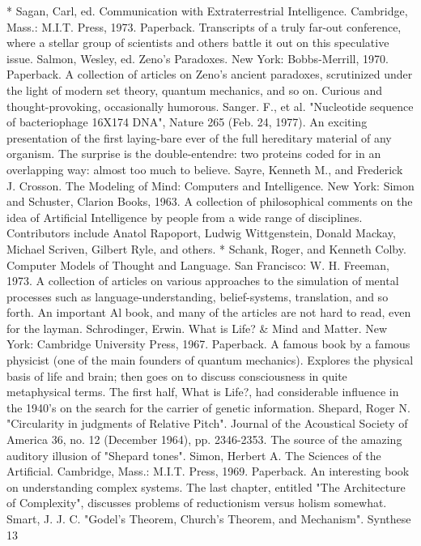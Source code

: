 * Sagan, Carl, ed. Communication with Extraterrestrial Intelligence. Cambridge, Mass.:
  M.I.T. Press, 1973. Paperback. Transcripts of a truly far-out conference, where a stellar
  group of scientists and others battle it out on this speculative issue.
Salmon, Wesley, ed. Zeno's Paradoxes. New York: Bobbs-Merrill, 1970. Paperback. A
  collection of articles on Zeno's ancient paradoxes, scrutinized under the light of modern
  set theory, quantum mechanics, and so on. Curious and thought-provoking,
  occasionally humorous.
Sanger. F., et al. "Nucleotide sequence of bacteriophage 16X174 DNA", Nature 265
  (Feb. 24, 1977). An exciting presentation of the first laying-bare ever of the full
  hereditary material of any organism. The surprise is the double-entendre: two proteins
  coded for in an overlapping way: almost too much to believe.
Sayre, Kenneth M., and Frederick J. Crosson. The Modeling of Mind: Computers and
  Intelligence. New York: Simon and Schuster, Clarion Books, 1963. A collection of
  philosophical comments on the idea of Artificial Intelligence by people from a wide
  range of disciplines. Contributors include Anatol Rapoport, Ludwig Wittgenstein,
  Donald Mackay, Michael Scriven, Gilbert Ryle, and others.
* Schank, Roger, and Kenneth Colby. Computer Models of Thought and Language. San
  Francisco: W. H. Freeman, 1973. A collection of articles on various approaches to the
  simulation of mental processes such as language-understanding, belief-systems,
  translation, and so forth. An important Al book, and many of the articles are not hard to
  read, even for the layman.
Schrodinger, Erwin. What is Life? \& Mind and Matter. New York: Cambridge University
  Press, 1967. Paperback. A famous book by a famous physicist (one of the main
  founders of quantum mechanics). Explores the physical basis of life and brain; then
  goes on to discuss consciousness in quite metaphysical terms. The first half, What is
  Life?, had considerable influence in the 1940's on the search for the carrier of genetic
  information.
Shepard, Roger N. "Circularity in judgments of Relative Pitch". Journal of the Acoustical
  Society of America 36, no. 12 (December 1964), pp. 2346-2353. The source of the
  amazing auditory illusion of "Shepard tones".
Simon, Herbert A. The Sciences of the Artificial. Cambridge, Mass.: M.I.T. Press, 1969.
  Paperback. An interesting book on understanding complex systems. The last chapter,
  entitled "The Architecture of Complexity", discusses problems of reductionism versus
  holism somewhat.
Smart, J. J. C. "Godel's Theorem, Church's Theorem, and Mechanism". Synthese 13
